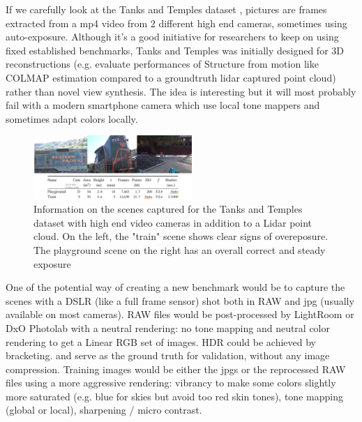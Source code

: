 If we carefully look at the Tanks and Temples dataset \cite{Knapitsch2017TanksAndTemples}, pictures are frames extracted from a mp4 video from 2 different high end cameras, sometimes using auto-exposure. Although it's a good initiative for researchers to keep on using fixed established benchmarks, Tanks and Temples was initially designed for 3D reconstructions (e.g. evaluate performances of Structure from motion like COLMAP estimation compared to a groundtruth lidar captured point cloud) rather than novel view synthesis. The idea is interesting but it will most probably fail with a modern smartphone camera which use local tone mappers and sometimes adapt colors locally.

\label{sec:remplementation}
\begin{figure}[H]
    \centering
    \includegraphics[width=6cm]{figures/tanks_and_temples.png}
    \caption{Information on the scenes captured for the Tanks and Temples dataset with high end video cameras in addition to a Lidar point cloud. On the left, the "train" scene shows clear signs of overeposure. The playground scene on the right has an overall correct and steady exposure}
    \label{fig:tank_and_temples}
\end{figure}

One of the potential way of creating a new benchmark would be to capture the scenes with a DSLR (like a full frame sensor) shot both in RAW and jpg (usually available on most cameras). RAW files would be post-processed by LightRoom or DxO Photolab with a neutral rendering: no tone mapping and neutral color rendering to get a Linear RGB set of images. HDR could be achieved by bracketing. and serve as the ground truth for validation, without any image compression. Training images would be either the jpgs or the reprocessed RAW files using a more aggressive rendering: vibrancy to make some colors slightly more saturated (e.g. blue for skies but avoid too red skin tones), tone mapping (global or local), sharpening / micro contrast.

